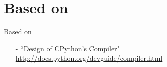 \section{Based on}
\begin{frame}{Based on}
\begin{itemize}
\item[-] ``Design of CPython's Compiler" \url{http://docs.python.org/devguide/compiler.html}
\end{itemize}
\end{frame}